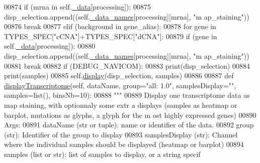 \begin{DoxyCode}
00874                 \textcolor{keywordflow}{if} (mrna \textcolor{keywordflow}{in} self.\hyperlink{classnavicom_1_1navicom_1_1NaviCom_a407b2b5c30a5652ee85c4be54b3e6679}{_data}[processing]):
00875                     disp\_selection.append((self.\hyperlink{classnavicom_1_1navicom_1_1NaviCom_ab8c34ab1a6d2a23f9b9ecee65375317a}{_data_names}[processing][mrna], \textcolor{stringliteral}{"m
      ap\_staining"}))
00876                     \textcolor{keywordflow}{break}
00877         \textcolor{keywordflow}{elif} (background \textcolor{keywordflow}{in} gene\_alias):
00878             \textcolor{keywordflow}{for} gene \textcolor{keywordflow}{in} TYPES\_SPEC[\textcolor{stringliteral}{"cCNA"}]+TYPES\_SPEC[\textcolor{stringliteral}{"dCNA"}]:
00879                 \textcolor{keywordflow}{if} (gene \textcolor{keywordflow}{in} self.\hyperlink{classnavicom_1_1navicom_1_1NaviCom_a407b2b5c30a5652ee85c4be54b3e6679}{_data}[processing]):
00880                     disp\_selection.append((self.\hyperlink{classnavicom_1_1navicom_1_1NaviCom_ab8c34ab1a6d2a23f9b9ecee65375317a}{_data_names}[processing][mrna], \textcolor{stringliteral}{"m
      ap\_staining"}))
00881                     \textcolor{keywordflow}{break}
00882         \textcolor{keywordflow}{if} (DEBUG\_NAVICOM):
00883             \textcolor{keywordflow}{print}(disp\_selection)
00884             \textcolor{keywordflow}{print}(samples)
00885         self.\hyperlink{classnavicom_1_1navicom_1_1NaviCom_ad7d4390d700d4a6d2533647887f8ab94}{display}(disp\_selection, samples)
00886 
00887     \textcolor{keyword}{def }\hyperlink{classnavicom_1_1navicom_1_1NaviCom_a001dadf6f3dc0c77ba5b14da621b110d}{displayTranscriptome}(self, dataName, group="all: 1.0\textcolor{stringliteral}{", samplesDisplay="}\textcolor{stringliteral}{",
       samples=list(), binsNb=10):}
00888 \textcolor{stringliteral}{        }\textcolor{stringliteral}{"""}
00889 \textcolor{stringliteral}{        Display one transcriptome data as map staining, with optionnaly some extr
      a displays (samples as heatmap or barplot, mutations as glyphs, a glyph for the m
      ost highly expressed genes)}
00890 \textcolor{stringliteral}{        Args:}
00891 \textcolor{stringliteral}{            dataName (str or tuple): name or identifier of the data.}
00892 \textcolor{stringliteral}{            group (str): Identifier of the group to display}
00893 \textcolor{stringliteral}{            samplesDisplay (str): Channel where the individual samples should be 
      displayed (heatmap or barplot)}
00894 \textcolor{stringliteral}{            samples (list or str): list of samples to display, or a string specif
}
\end{DoxyCode}
